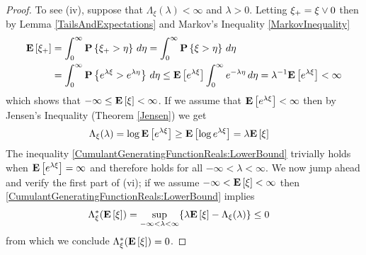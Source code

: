 \begin{proof}
To see (iv), suppose that $\Lambda_\xi (\lambda) < \infty$ and $\lambda > 0$.  Letting $\xi_+ = \xi \vee 0$ then by Lemma \ref{TailsAndExpectations} and Markov's Inequality \ref{MarkovInequality}
\begin{align*}
\textbf{E}\left[\xi_+\right] &= \int_0^\infty \textbf{P}\left \{\xi_+ > \eta \right \} \, d\eta = \int_0^\infty \textbf{P}\left \{\xi > \eta \right \} \, d\eta \\
&=\int_0^\infty \textbf{P}\left \{e^{\lambda\xi} > e^{\lambda\eta}  \right \}\, d\eta \leq \textbf{E}\left[e^{\lambda \xi}\right] \int_0^\infty e^{-\lambda\eta} \, d\eta = \lambda^{-1} \textbf{E}\left[e^{\lambda \xi}\right] < \infty
\end{align*}
which shows that $-\infty \leq \textbf{E}\left[\xi\right] < \infty$.  If we assume that $\textbf{E}\left[e^{\lambda \xi}\right] < \infty$ then
by Jensen's Inequality (Theorem \ref{Jensen}) we get 
\begin{align}\label{CumulantGeneratingFunctionReals:LowerBound}
\Lambda_\xi(\lambda) &= \log \textbf{E}\left[e^{\lambda \xi}\right] \geq \textbf{E}\left[\log  e^{\lambda \xi}\right]  = \lambda \textbf{E}\left[\xi\right]
\end{align}
The inequality \eqref{CumulantGeneratingFunctionReals:LowerBound} trivially holds when $\textbf{E}\left[e^{\lambda \xi}\right] = \infty$ and therefore holds for all $-\infty < \lambda < \infty$.  
We now jump ahead and verify the first part of (vi); if we assume $-\infty < \textbf{E}\left[\xi\right] < \infty$ then \eqref{CumulantGeneratingFunctionReals:LowerBound}  implies
\begin{align*}
\Lambda_\xi^*(\textbf{E}\left[\xi\right]) &= \sup_{-\infty < \lambda < \infty} \lbrace \lambda \textbf{E}\left[\xi\right] - \Lambda_\xi(\lambda) \rbrace \leq 0
\end{align*}
from which we conclude $\Lambda_\xi^*(\textbf{E}\left[\xi\right])=0$.


\end{proof}

